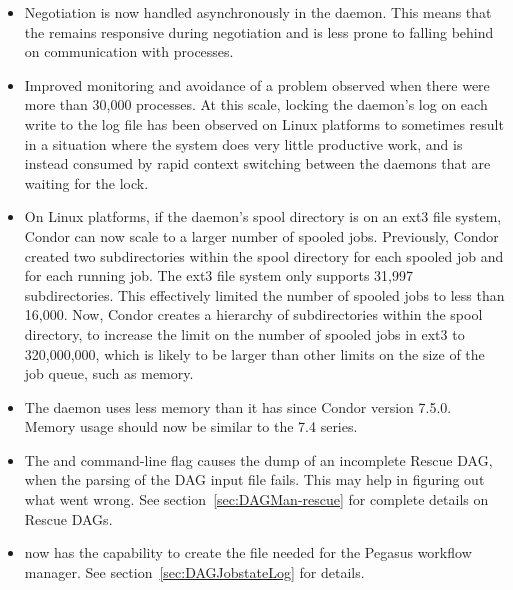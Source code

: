 \begin{itemize}

\item Negotiation is now handled asynchronously in the  daemon.
This means that the  remains responsive during 
negotiation and is less prone to falling behind on communication 
with  processes.

\item Improved monitoring and avoidance of a  problem
observed when there were more than 30,000  processes.
At this scale,
locking the  daemon's log on each write to the log file
has been observed
on Linux platforms to sometimes result in a situation where the system does
very little productive work, and is instead consumed by rapid context
switching between the  daemons that are waiting for the lock.

\item On Linux platforms, if the  daemon's spool directory is
  on an ext3 file system, Condor can now scale to a larger number
  of spooled jobs.  Previously, Condor created two subdirectories
  within the spool directory for each spooled job and for each running
  job.  The ext3 file system only supports 31,997 subdirectories.  This
  effectively limited the number of spooled jobs to less than 16,000.
  Now, Condor creates a hierarchy of subdirectories within
  the spool directory, to increase the limit on the number of spooled jobs
  in ext3 to 320,000,000, which is likely to be larger than other limits
  on the size of the job queue, such as memory.

\item The  daemon uses less memory than it has since 
Condor version 7.5.0.
Memory usage should now be similar to the 7.4 series.

\item The  and  command-line flag
 causes the dump of an incomplete Rescue DAG,
when the parsing of the DAG input file fails.
This may help in figuring out what went wrong.
See section~\ref{sec:DAGMan-rescue} for complete details on Rescue DAGs.

\item {} now has the capability to create the
 file needed for the Pegasus workflow manager.
See section~\ref{sec:DAGJobstateLog} for details.


\end{itemize}
